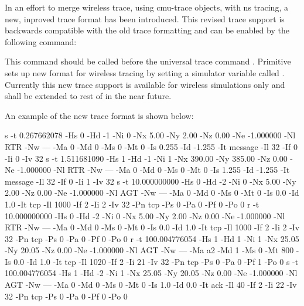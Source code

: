 In an effort to merge wireless trace, using cmu-trace objects, with
ns tracing, a new, inproved trace format has been introduced. This revised
trace support is backwards compatible with the old trace formatting and
can be enabled by the following command:
This command should be called before the universal trace command . Primitive  sets up new
format for wireless tracing by setting a simulator variable called
. Currently this new trace support is available for
wireless simulations only and shall be extended to rest of \ns in the near
future.

An example of the new trace format is shown below:
\begin{program}
s -t 0.267662078 -Hs 0 -Hd -1 -Ni 0 -Nx 5.00 -Ny 2.00 -Nz 0.00 -Ne
-1.000000 -Nl RTR -Nw --- -Ma 0 -Md 0 -Ms 0 -Mt 0 -Is 0.255 -Id -1.255 -It
message -Il 32 -If 0 -Ii 0 -Iv 32
s -t 1.511681090 -Hs 1 -Hd -1 -Ni 1 -Nx 390.00 -Ny 385.00 -Nz 0.00 -Ne
-1.000000 -Nl RTR -Nw --- -Ma 0 -Md 0 -Ms 0 -Mt 0 -Is 1.255 -Id -1.255 -It
message -Il 32 -If 0 -Ii 1 -Iv 32
s -t 10.000000000 -Hs 0 -Hd -2 -Ni 0 -Nx 5.00 -Ny 2.00 -Nz 0.00 -Ne
-1.000000 -Nl AGT -Nw --- -Ma 0 -Md 0 -Ms 0 -Mt 0 -Is 0.0 -Id 1.0 -It tcp -Il 1000 -If
2 -Ii 2 -Iv 32 -Pn tcp -Ps 0 -Pa 0 -Pf 0 -Po 0
r -t 10.000000000 -Hs 0 -Hd -2 -Ni 0 -Nx 5.00 -Ny 2.00 -Nz 0.00 -Ne
-1.000000 -Nl RTR -Nw --- -Ma 0 -Md 0 -Ms 0 -Mt 0 -Is 0.0 -Id 1.0 -It tcp -Il 1000 -If
2 -Ii 2 -Iv 32 -Pn tcp -Ps 0 -Pa 0 -Pf 0 -Po 0
r -t 100.004776054 -Hs 1 -Hd 1 -Ni 1 -Nx 25.05 -Ny 20.05 -Nz 0.00 -Ne
-1.000000 -Nl AGT -Nw --- -Ma a2 -Md 1 -Ms 0 -Mt 800 -Is 0.0 -Id 1.0 -It
tcp -Il 1020 -If 2 -Ii 21 -Iv 32 -Pn tcp -Ps 0 -Pa 0 -Pf 1 -Po 0
s -t 100.004776054 -Hs 1 -Hd -2 -Ni 1 -Nx 25.05 -Ny 20.05 -Nz 0.00 -Ne
-1.000000 -Nl AGT -Nw --- -Ma 0 -Md 0 -Ms 0 -Mt 0 -Is 1.0 -Id 0.0 -It ack -Il 40
-If 2 -Ii 22 -Iv 32 -Pn tcp -Ps 0 -Pa 0 -Pf 0 -Po 0 
\end{program}

